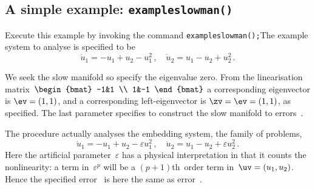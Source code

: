 \documentclass[11pt,a5paper]{article}
\def\eps{\varepsilon}
\begin{document}
\subsection{A simple example: \texttt{exampleslowman()}} 
\label{ss:eg}
Execute this example by invoking the command
\verb|exampleslowman();|\quad The example system to analyse
is specified to be \cite[Example~2.1]{Roberts2014a}
\begin{equation*}
\dot u_1=-u_1+u_2-u_1^2\,, \quad \dot u_2=u_1-u_2+u_2^2\,.
\end{equation*}
We seek the slow manifold so specify the eigenvalue zero.
From the linearisation matrix~\(\begin{bmat} -1&1 \\ 1&-1
\end{bmat}\) a corresponding eigenvector is \(\ev=(1,1)\),
and a corresponding left-eigenvector is \(\zv=\ev=(1,1)\),
as specified. The last parameter specifies to construct the
slow manifold to errors~\Ord{\eps^5}.

The procedure actually analyses the embedding system, the
family of problems,
\begin{equation*}
\dot u_1=-u_1+u_2-\eps u_1^2\,, \quad \dot u_2=u_1-u_2+\eps u_2^2\,.
\end{equation*}
Here the artificial parameter~\(\eps\) has a physical
interpretation in that it counts the nonlinearity: a term
in~\(\eps^p\) will be a \((p+1)\)th~order term
in~\(\uv=(u_1,u_2)\). Hence the specified error~\Ord{\eps^5}
is here the same as error~.
\end{document}
